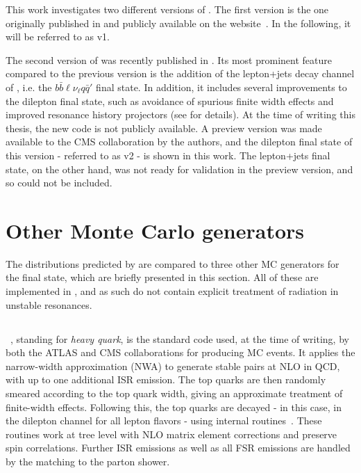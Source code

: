 This work investigates two different versions of \bbfourl. The first version is the one originally published in  and publicly available on the \powheg website~\cite{Powheg:website}. In the following, it will be referred to as \bbfourl v1.

The second version of \bbfourl was recently published in . Its most prominent feature compared to the previous version is the addition of the lepton+jets decay channel of \ttbar, i.e. the $b \bar{b} \ell \nu_{\ell} q \bar{q}'$ final state. In addition, it includes several improvements to the dilepton final state, such as avoidance of spurious finite width effects and improved resonance history projectors (see  for details). At the time of writing this thesis, the new code is not publicly available. A preview version was made available to the CMS collaboration by the authors, and the dilepton final state of this version - referred to as \bbfourl v2 - is shown in this work. The lepton+jets final state, on the other hand, was not ready for validation in the preview version, and so could not be included.

\section{Other \ttbartitle Monte Carlo generators}
\label{sec:bb4l:others}

The distributions predicted by \bbfourl are compared to three other MC generators for the \tttW final state, which are briefly presented in this section. All of these are implemented in \powhegvtwo, and as such do not contain explicit treatment of radiation in unstable resonances.

\subsection{\texorpdfstring{\hvq}{hvq}}

\hvq~\cite{Frixione:2007nw}, standing for \textit{heavy quark}, is the standard code used, at the time of writing, by both the ATLAS and CMS collaborations for producing \ttbar MC events. It applies the narrow-width approximation (NWA) to generate stable \ttbar pairs at NLO in QCD, with up to one additional ISR emission. The top quarks are then randomly smeared according to the top quark width, giving an approximate treatment of finite-width effects. Following this, the top quarks are decayed - in this case, in the dilepton channel for all lepton flavors - using internal \powheg routines~\cite{Frixione:2007zp}. These routines work at tree level with NLO matrix element corrections and preserve spin correlations. Further ISR emissions as well as all FSR emissions are handled by the matching to the parton shower.

